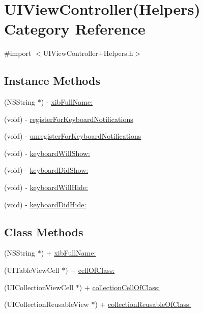 \hypertarget{category_u_i_view_controller_07_helpers_08}{\section{U\-I\-View\-Controller(Helpers) Category Reference}
\label{category_u_i_view_controller_07_helpers_08}
}


{\ttfamily \#import $<$U\-I\-View\-Controller+\-Helpers.\-h$>$}

\subsection*{Instance Methods}
\begin{DoxyCompactItemize}
\item 
(N\-S\-String $\ast$) -\/ \hyperlink{category_u_i_view_controller_07_helpers_08_a43e4e6cebd75e5cefc32bdd145977127}{xib\-Full\-Name\-:}
\item 
(void) -\/ \hyperlink{category_u_i_view_controller_07_helpers_08_a4173ab4a8c811b6675c8e8cc16e60214}{register\-For\-Keyboard\-Notifications}
\item 
(void) -\/ \hyperlink{category_u_i_view_controller_07_helpers_08_abea16cb108e751f1dcef5272c8ee06ba}{unregister\-For\-Keyboard\-Notifications}
\item 
(void) -\/ \hyperlink{category_u_i_view_controller_07_helpers_08_ab0307c74a93f480bd9bd43cbf43dcaa8}{keyboard\-Will\-Show\-:}
\item 
(void) -\/ \hyperlink{category_u_i_view_controller_07_helpers_08_a2b3134402e311793785ae0545547e75e}{keyboard\-Did\-Show\-:}
\item 
(void) -\/ \hyperlink{category_u_i_view_controller_07_helpers_08_a8fc966b4271a96a5937990ead685597a}{keyboard\-Will\-Hide\-:}
\item 
(void) -\/ \hyperlink{category_u_i_view_controller_07_helpers_08_acd91aa8df79b56f065cc12f8a3946ad2}{keyboard\-Did\-Hide\-:}
\end{DoxyCompactItemize}
\subsection*{Class Methods}
\begin{DoxyCompactItemize}
\item 
(N\-S\-String $\ast$) + \hyperlink{category_u_i_view_controller_07_helpers_08_a43e4e6cebd75e5cefc32bdd145977127}{xib\-Full\-Name\-:}
\item 
(U\-I\-Table\-View\-Cell $\ast$) + \hyperlink{category_u_i_view_controller_07_helpers_08_a6b95a22d9aa72ea17ba6ad11b5e52ee2}{cell\-Of\-Class\-:}
\item 
(U\-I\-Collection\-View\-Cell $\ast$) + \hyperlink{category_u_i_view_controller_07_helpers_08_a8180bf39e35c3dcca5ab27e4e884cb38}{collection\-Cell\-Of\-Class\-:}
\item 
(U\-I\-Collection\-Reusable\-View $\ast$) + \hyperlink{category_u_i_view_controller_07_helpers_08_a53939a5be84d8df98ebc1a2e124b01c8}{collection\-Reusable\-Of\-Class\-:}
\end{DoxyCompactItemize}


